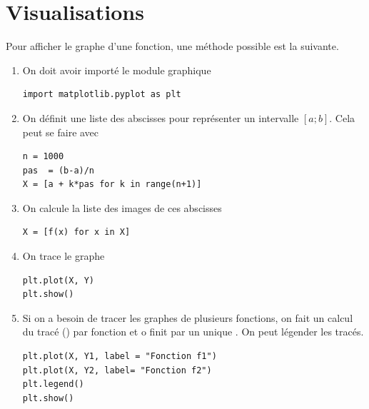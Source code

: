 \section{Visualisations}
Pour afficher le graphe d'une fonction, une méthode possible est la suivante.
\begin{enumerate}
\item On doit avoir importé le module graphique
\begin{lstlisting}
import matplotlib.pyplot as plt
\end{lstlisting}
\item On définit une liste des abscisses pour représenter un intervalle $[a; b]$. Cela peut se faire avec 
\begin{lstlisting}
n = 1000
pas  = (b-a)/n
X = [a + k*pas for k in range(n+1)]
\end{lstlisting}
\item On calcule la liste des images de ces abscisses
\begin{lstlisting}
X = [f(x) for x in X]
\end{lstlisting}
\item On trace le graphe
\begin{lstlisting}
plt.plot(X, Y)
plt.show()
\end{lstlisting}
\item Si on a besoin de tracer les graphes de plusieurs fonctions, on fait un calcul du tracé () par fonction et o finit par un unique . On peut légender les tracés.
\begin{lstlisting}
plt.plot(X, Y1, label = "Fonction f1")
plt.plot(X, Y2, label= "Fonction f2")
plt.legend()
plt.show()
\end{lstlisting}
\end{enumerate}
